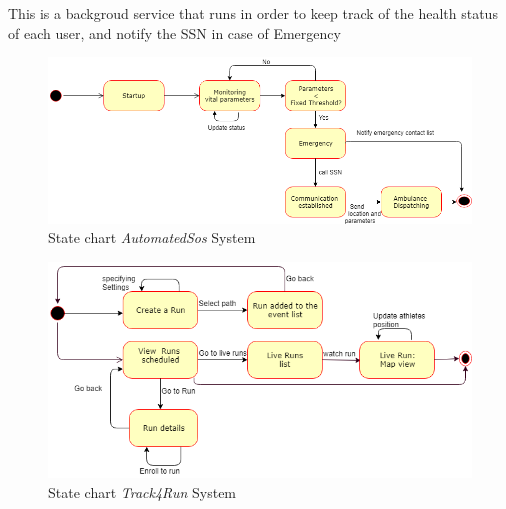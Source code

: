 This is a backgroud service that runs in order to keep track of the health status of each user, and notify the SSN in case of Emergency 
\begin{figure}[H]
    \centering
    \includegraphics[scale=0.4]{Pictures/state chart 2.png}
    \caption{State chart  \emph{AutomatedSos} System}
\end{figure}
\begin{figure}[H]
    \centering
    \includegraphics[scale=0.4]{Pictures/statechart3.png}
    \caption{State chart  \emph{Track4Run} System}
\end{figure}